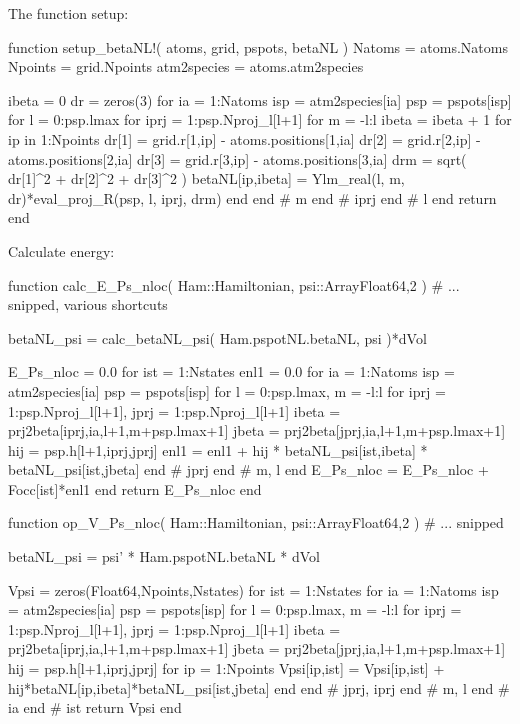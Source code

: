 The function setup:
\begin{juliacode}
function setup_betaNL!( atoms, grid, pspots, betaNL )
  Natoms = atoms.Natoms
  Npoints = grid.Npoints
  atm2species = atoms.atm2species

  ibeta = 0
  dr = zeros(3)
  for ia = 1:Natoms
    isp = atm2species[ia]
    psp = pspots[isp]
    for l = 0:psp.lmax
    for iprj = 1:psp.Nproj_l[l+1]
    for m = -l:l
      ibeta = ibeta + 1
      for ip in 1:Npoints
        dr[1] = grid.r[1,ip] - atoms.positions[1,ia]
        dr[2] = grid.r[2,ip] - atoms.positions[2,ia]
        dr[3] = grid.r[3,ip] - atoms.positions[3,ia]
        drm = sqrt( dr[1]^2 + dr[2]^2 + dr[3]^2 )
        betaNL[ip,ibeta] = Ylm_real(l, m, dr)*eval_proj_R(psp, l, iprj, drm)
      end
    end # m
    end # iprj
    end # l
  end
  return
end
\end{juliacode}

Calculate energy:
\begin{juliacode}
function calc_E_Ps_nloc( Ham::Hamiltonian, psi::Array{Float64,2} )
  # ... snipped, various shortcuts

  betaNL_psi = calc_betaNL_psi( Ham.pspotNL.betaNL, psi )*dVol

  E_Ps_nloc = 0.0
  for ist = 1:Nstates
    enl1 = 0.0
    for ia = 1:Natoms
      isp = atm2species[ia]
      psp = pspots[isp]
      for l = 0:psp.lmax, m = -l:l
        for iprj = 1:psp.Nproj_l[l+1], jprj = 1:psp.Nproj_l[l+1]
          ibeta = prj2beta[iprj,ia,l+1,m+psp.lmax+1]
          jbeta = prj2beta[jprj,ia,l+1,m+psp.lmax+1]
          hij = psp.h[l+1,iprj,jprj]
          enl1 = enl1 + hij * betaNL_psi[ist,ibeta] * betaNL_psi[ist,jbeta]
        end # jprj
      end # m, l
    end
    E_Ps_nloc = E_Ps_nloc + Focc[ist]*enl1
  end
  return E_Ps_nloc
end
\end{juliacode}

\begin{juliacode}
function op_V_Ps_nloc( Ham::Hamiltonian, psi::Array{Float64,2} )
  # ... snipped

  betaNL_psi = psi' * Ham.pspotNL.betaNL * dVol
  
  Vpsi = zeros(Float64,Npoints,Nstates)
  for ist = 1:Nstates
    for ia = 1:Natoms
      isp = atm2species[ia]
      psp = pspots[isp]
      for l = 0:psp.lmax, m = -l:l
        for iprj = 1:psp.Nproj_l[l+1], jprj = 1:psp.Nproj_l[l+1]
          ibeta = prj2beta[iprj,ia,l+1,m+psp.lmax+1]
          jbeta = prj2beta[jprj,ia,l+1,m+psp.lmax+1]
          hij = psp.h[l+1,iprj,jprj]
          for ip = 1:Npoints
              Vpsi[ip,ist] = Vpsi[ip,ist] + hij*betaNL[ip,ibeta]*betaNL_psi[ist,jbeta]
          end
        end # jprj, iprj
      end # m, l
    end # ia
  end # ist
  return Vpsi
end
\end{juliacode}


